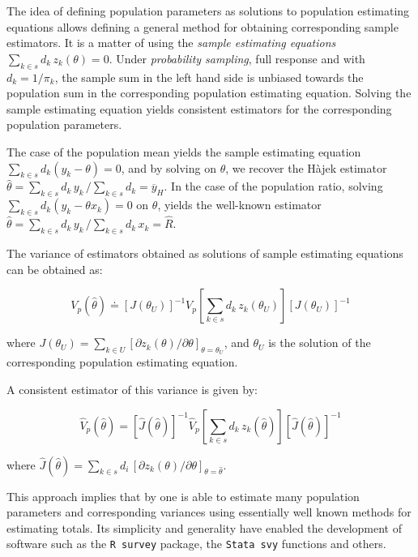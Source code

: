 \documentclass[
  12pt,
]{book}
\begin{document}
The idea of defining population parameters as solutions to population estimating equations allows defining a general method for obtaining corresponding sample estimators. It is a matter of using the \emph{sample estimating equations} \(\sum _{k \in s} d_k \, z_k (\theta) = 0\). Under \emph{probability sampling}, full response and with \(d_k = 1 / \pi_k\), the sample sum in the left hand side is unbiased towards the population sum in the corresponding population estimating equation. Solving the sample estimating equation yields consistent estimators for the corresponding population parameters.

The case of the population mean yields the sample estimating equation \(\sum _{k \in s} d_k (y_k - \theta) = 0\), and by solving on \(\theta\), we recover the Hàjek estimator \(\widehat \theta = \sum _{k \in s} d_k \, y_k \, / \sum _{k \in s} d_k = \overline y_H\). In the case of the population ratio, solving \(\sum _{k \in s} d_k (y_k - \theta x_k) = 0\) on \(\theta\), yields the well-known estimator \(\widehat \theta = \sum _{k \in s} d_k \, y_k \, / \sum _{k \in s} d_k \, x_k = \widehat R\).

The variance of estimators obtained as solutions of sample estimating equations can be obtained as:

\[
V_p (\widehat \theta) \doteq \left[ J (\theta_U) \right] ^{-1} V_p \left[ \sum _{k \in s} d_k \, z_k (\theta_U) \right] \left[ J (\theta_U) \right] ^{-1}
\]

where \(J (\theta_U) = \sum _{k \in U} \left[ \partial{z_k (\theta)} / \partial \theta \right]_{\theta = \theta_U}\), and \(\theta_U\) is the solution of the corresponding population estimating equation.

A consistent estimator of this variance is given by:

\[
\widehat V_p (\widehat \theta) = \left[ \widehat J ( \widehat \theta) \right] ^{-1} \widehat V_p \left[ \sum _{k \in s} d_k \, z_k (\widehat \theta)\right] \left[ \widehat J ( \widehat \theta) \right] ^{-1}
\]

where \(\widehat J (\widehat \theta) = \sum _{k \in s} d_i \, \left[ \partial{z_k ( \theta)} / \partial \theta \right]_{\theta = \widehat \theta}\).

This approach implies that by one is able to estimate many population parameters and corresponding variances using essentially well known methods for estimating totals. Its simplicity and generality have enabled the development of software such as the \texttt{R\ survey} package, the \texttt{Stata\ svy} functions and others.
\end{document}
